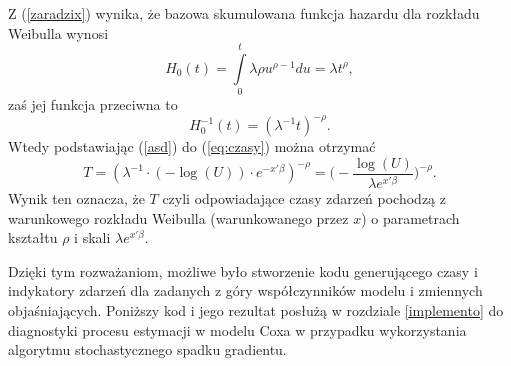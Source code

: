 Z (\ref{zaradzix}) wynika, że bazowa skumulowana funkcja hazardu dla rozkładu Weibulla wynosi
\begin{equation}
H_0(t) = \int\limits_{0}^{t} \lambda\rho u^{\rho-1} du = \lambda t^{\rho},
\end{equation}
zaś jej funkcja przeciwna to
\begin{equation}\label{asd}
H_0^{-1}(t)= (\lambda^{-1}t)^{-\rho}.
\end{equation}
Wtedy podstawiając (\ref{asd}) do (\ref{eq:czasy}) można otrzymać
\begin{equation}
T = (\lambda^{-1}\cdot(-\log(U))\cdot e^{-x'\beta})^{-\rho} = \Big(-\frac{\log(U)}{\lambda e^{x'\beta}}\Big)^{-\rho}.
\end{equation}
Wynik ten oznacza, że $T$ czyli odpowiadające czasy zdarzeń pochodzą z warunkowego rozkładu Weibulla (warunkowanego przez $x$) o parametrach kształtu $\rho$ i skali $\lambda  e^{x'\beta}$.

Dzięki tym rozważaniom, możliwe było stworzenie kodu generującego czasy i indykatory zdarzeń dla zadanych z góry współczynników modelu i zmiennych objaśniających. Poniższy kod i jego rezultat posłużą w rozdziale \ref{implemento} do diagnostyki procesu estymacji w modelu Coxa w przypadku wykorzystania algorytmu stochastycznego spadku gradientu.

